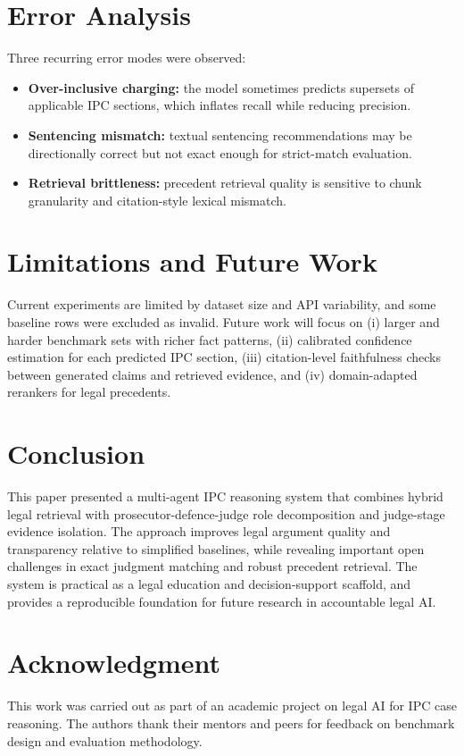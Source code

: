 \documentclass[conference]{IEEEtran}
\begin{document}
\section{Error Analysis}
Three recurring error modes were observed:
\begin{itemize}
\item \textbf{Over-inclusive charging:} the model sometimes predicts supersets of applicable IPC sections, which inflates recall while reducing precision.
\item \textbf{Sentencing mismatch:} textual sentencing recommendations may be directionally correct but not exact enough for strict-match evaluation.
\item \textbf{Retrieval brittleness:} precedent retrieval quality is sensitive to chunk granularity and citation-style lexical mismatch.
\end{itemize}

\section{Limitations and Future Work}
Current experiments are limited by dataset size and API variability, and some baseline rows were excluded as invalid. Future work will focus on (i) larger and harder benchmark sets with richer fact patterns, (ii) calibrated confidence estimation for each predicted IPC section, (iii) citation-level faithfulness checks between generated claims and retrieved evidence, and (iv) domain-adapted rerankers for legal precedents.

\section{Conclusion}
This paper presented a multi-agent IPC reasoning system that combines hybrid legal retrieval with prosecutor-defence-judge role decomposition and judge-stage evidence isolation. The approach improves legal argument quality and transparency relative to simplified baselines, while revealing important open challenges in exact judgment matching and robust precedent retrieval. The system is practical as a legal education and decision-support scaffold, and provides a reproducible foundation for future research in accountable legal AI.

\section*{Acknowledgment}
This work was carried out as part of an academic project on legal AI for IPC case reasoning. The authors thank their mentors and peers for feedback on benchmark design and evaluation methodology.
\end{document}
